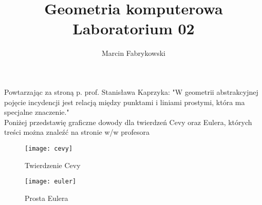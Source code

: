 \documentclass[a4paper, 12pt]{article}
\author{Marcin Fabrykowski}
\title{Geometria komputerowa\\Laboratorium 02}
\begin{document}
\maketitle
\newpage
Powtarzając za stroną p. prof. Stanisława Kaprzyka: "W geometrii abstrakcyjnej pojęcie incydencji jest relacją między punktami i liniami prostymi, która ma specjalne znaczenie."\\
Poniżej przedstawię graficzne dowody dla twierdzeń Cevy oraz Eulera, których treści można znaleźć na stronie w/w profesora

\begin{figure}
\texttt{[image: cevy]}
\caption{Twierdzenie Cevy}
\end{figure}
\begin{figure}
\texttt{[image: euler]}
\caption{Prosta Eulera}
\end{figure}
\end{document}
